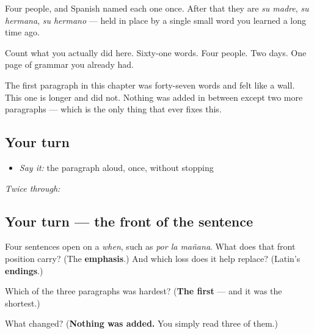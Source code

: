 \begin{culture}
Four people, and Spanish named each one once. After that they are \emph{su madre}, \emph{su hermana}, \emph{su hermano} — held in place by a single small word you learned a long time ago.

Count what you actually did here. Sixty-one words. Four people. Two days. One page of grammar you already had.

The first paragraph in this chapter was forty-seven words and felt like a wall. This one is longer and did not. Nothing was added in between except two more paragraphs — which is the only thing that ever fixes this.
\end{culture}

\subsection*{Your turn}
\begin{itemize}
\raggedright
  \item \emph{Say it:} the paragraph aloud, once, without stopping
\end{itemize}

\emph{Twice through:}

\subsection*{Your turn — the front of the sentence}
Four sentences open on a \emph{when}, such as \emph{por la mañana}. What does that front position carry? (The \textbf{emphasis}.) And which loss does it help replace? (Latin's \textbf{endings}.)

\begin{tcolorbox}[breakable,colback=teal!4,colframe=teal!35!black,title={Before you move on}]
Which of the three paragraphs was hardest? (\textbf{The first} — and it was the shortest.)

What changed? (\textbf{Nothing was added.} You simply read three of them.)
\end{tcolorbox}
